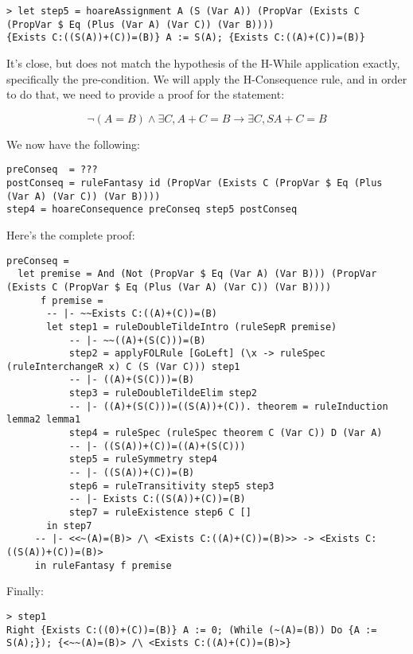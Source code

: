 \documentclass{article}
\begin{document}
\begin{lstlisting}
> let step5 = hoareAssignment A (S (Var A)) (PropVar (Exists C (PropVar $ Eq (Plus (Var A) (Var C)) (Var B))))
{Exists C:((S(A))+(C))=(B)} A := S(A); {Exists C:((A)+(C))=(B)}
\end{lstlisting}

It's close, but does not match the hypothesis of the H-While application exactly, specifically the pre-condition. We will apply the H-Consequence rule, and in order to do that, we need to provide a proof for the statement:

$$\neg (A = B) \land \exists C, A + C = B \to \exists C, S A + C = B$$

We now have the following:

\begin{lstlisting}
preConseq  = ???
postConseq = ruleFantasy id (PropVar (Exists C (PropVar $ Eq (Plus (Var A) (Var C)) (Var B))))
step4 = hoareConsequence preConseq step5 postConseq
\end{lstlisting}

Here's the complete proof:

\begin{lstlisting}
preConseq = 
  let premise = And (Not (PropVar $ Eq (Var A) (Var B))) (PropVar (Exists C (PropVar $ Eq (Plus (Var A) (Var C)) (Var B))))
      f premise =
       -- |- ~~Exists C:((A)+(C))=(B)
       let step1 = ruleDoubleTildeIntro (ruleSepR premise)
           -- |- ~~((A)+(S(C)))=(B)
           step2 = applyFOLRule [GoLeft] (\x -> ruleSpec (ruleInterchangeR x) C (S (Var C))) step1
           -- |- ((A)+(S(C)))=(B)
           step3 = ruleDoubleTildeElim step2
           -- |- ((A)+(S(C)))=((S(A))+(C)). theorem = ruleInduction lemma2 lemma1
           step4 = ruleSpec (ruleSpec theorem C (Var C)) D (Var A)
           -- |- ((S(A))+(C))=((A)+(S(C)))
           step5 = ruleSymmetry step4
           -- |- ((S(A))+(C))=(B)
           step6 = ruleTransitivity step5 step3
           -- |- Exists C:((S(A))+(C))=(B)
           step7 = ruleExistence step6 C []
       in step7
     -- |- <<~(A)=(B)> /\ <Exists C:((A)+(C))=(B)>> -> <Exists C:((S(A))+(C))=(B)>
     in ruleFantasy f premise
\end{lstlisting}

Finally:

\begin{lstlisting}
> step1
Right {Exists C:((0)+(C))=(B)} A := 0; (While (~(A)=(B)) Do {A := S(A);}); {<~~(A)=(B)> /\ <Exists C:((A)+(C))=(B)>}
\end{lstlisting}
\end{document}
